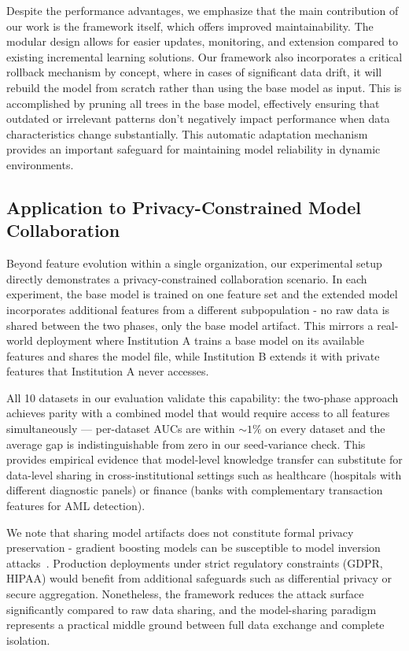 \documentclass[sigconf]{acmart}
\begin{document}
\begin{itemize}
Despite the performance advantages, we emphasize that the main contribution of our work is the framework itself, which offers improved maintainability. The modular design allows for easier updates, monitoring, and extension compared to existing incremental learning solutions. Our framework also incorporates a critical rollback mechanism by concept, where in cases of significant data drift, it will rebuild the model from scratch rather than using the base model as input. This is accomplished by pruning all trees in the base model, effectively ensuring that outdated or irrelevant patterns don't negatively impact performance when data characteristics change substantially. This automatic adaptation mechanism provides an important safeguard for maintaining model reliability in dynamic environments.

\subsection{Application to Privacy-Constrained Model Collaboration}

Beyond feature evolution within a single organization, our experimental setup directly demonstrates a privacy-constrained collaboration scenario. In each experiment, the base model is trained on one feature set and the extended model incorporates additional features from a different subpopulation - no raw data is shared between the two phases, only the base model artifact. This mirrors a real-world deployment where Institution A trains a base model on its available features and shares the model file, while Institution B extends it with private features that Institution A never accesses.

All 10 datasets in our evaluation validate this capability: the two-phase approach achieves parity with a combined model that would require access to all features simultaneously --- per-dataset AUCs are within $\sim 1\%$ on every dataset and the average gap is indistinguishable from zero in our seed-variance check. This provides empirical evidence that model-level knowledge transfer can substitute for data-level sharing in cross-institutional settings such as healthcare (hospitals with different diagnostic panels) or finance (banks with complementary transaction features for AML detection).

We note that sharing model artifacts does not constitute formal privacy preservation - gradient boosting models can be susceptible to model inversion attacks~\cite{fredrikson2015model}. Production deployments under strict regulatory constraints (GDPR, HIPAA) would benefit from additional safeguards such as differential privacy or secure aggregation. Nonetheless, the framework reduces the attack surface significantly compared to raw data sharing, and the model-sharing paradigm represents a practical middle ground between full data exchange and complete isolation.


\end{itemize}
\end{document}
